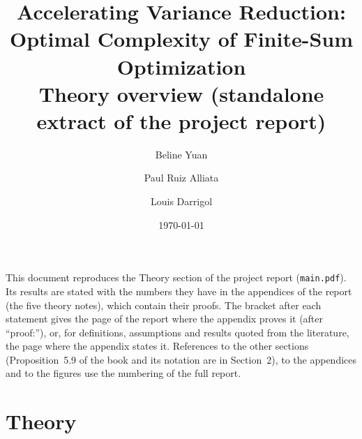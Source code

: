 \documentclass[11pt]{article}
\title{Accelerating Variance Reduction: Optimal Complexity of Finite-Sum Optimization\\[4pt]
\large Theory overview (standalone extract of the project report)}
\author{Beline Yuan \and Paul Ruiz Alliata \and Louis Darrigol}
\date{\today}
\begin{document}
\maketitle
\noindent This document reproduces the Theory section of the project report (\texttt{main.pdf}). Its results are
stated with the numbers they have in the appendices of the report (the five theory notes), which contain their
proofs. The bracket after each statement gives the page of the report where the appendix proves it (after
``proof:''), or, for definitions, assumptions and results quoted from the literature, the page where the appendix
states it. References to the other sections (Proposition~5.9 of the book and its notation are in Section~2), to the
appendices and to the figures use the numbering of the full report.

\setcounter{section}{3}          %
\section{Theory}




\end{document}
